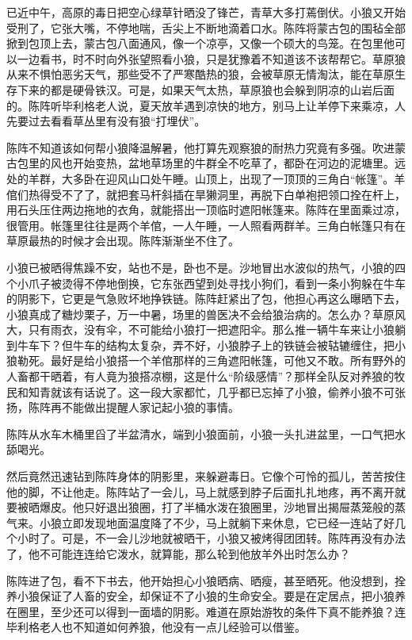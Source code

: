 \par 已近中午，高原的毒日把空心绿草针晒没了锋芒，青草大多打蔫倒伏。小狼又开始受刑了，它张大嘴，不停地喘，舌尖上不断地滴着口水。陈阵将蒙古包的围毡全部掀到包顶上去，蒙古包八面通风，像一个凉亭，又像一个硕大的鸟笼。在包里他可以一边看书，时不时向外张望照看小狼，只是犹豫着不知道该不该帮帮它。草原狼从来不惧怕恶劣天气，那些受不了严寒酷热的狼，会被草原无情淘汰，能在草原生存下来的都是硬骨铁汉。可是，如果天气太热，草原狼也会躲到阴凉的山岩后面的。陈阵听毕利格老人说，夏天放羊遇到凉快的地方，别马上让羊停下来乘凉，人先要过去看看草丛里有没有狼“打埋伏”。
\par 陈阵不知道该如何帮小狼降温解暑，他打算先观察狼的耐热力究竟有多强。吹进蒙古包里的风也开始变热，盆地草场里的牛群全不吃草了，都卧在河边的泥塘里。远处的羊群，大多卧在迎风山口处午睡。山顶上，出现了一顶顶的三角白“帐篷”。羊倌们热得受不了了，就把套马杆斜插在旱獭洞里，再脱下白单袍把领口拴在杆上，用石头压住两边拖地的衣角，就能搭出一顶临时遮阳帐篷来。陈阵在里面乘过凉，很管用。帐篷里往往是两个羊倌，一人午睡，一人照看两群羊。三角白帐篷只有在草原最热的时候才会出现。陈阵渐渐坐不住了。
\par 小狼已被晒得焦躁不安，站也不是，卧也不是。沙地冒出水波似的热气，小狼的四个小爪子被烫得不停地倒换，它东张西望到处寻找小狗们，看到一条小狗躲在牛车的阴影下，它更是气急败坏地挣铁链。陈阵赶紧出了包，他担心再这么曝晒下去，小狼真成了糖炒栗子，万一中暑，场里的兽医决不会给狼治病的。怎么办？草原风大，只有雨衣，没有伞，不可能给小狼打一把遮阳伞。那么推一辆牛车来让小狼躺到牛车下？但牛车的结构太复杂，弄不好，小狼脖子上的铁链会被轱辘缠住，把小狼勒死。最好是给小狼搭一个羊倌那样的三角遮阳帐篷，可他又不敢。所有野外的人畜都干晒着，有人竟为狼搭凉棚，这是什么“阶级感情”？那样全队反对养狼的牧民和知青就该有话说了。这一段大家都忙，几乎都已忘掉了小狼，偷养小狼不可张扬，陈阵再不能做出提醒人家记起小狼的事情。
\par 陈阵从水车木桶里舀了半盆清水，端到小狼面前，小狼一头扎进盆里，一口气把水舔喝光。
\par 然后竟然迅速钻到陈阵身体的阴影里，来躲避毒日。它像个可怜的孤儿，苦苦按住他的脚，不让他走。陈阵站了一会儿，马上就感到脖子后面扎扎地疼，再不离开就要被晒爆皮。他只好退出狼圈，打了半桶水泼在狼圈里，沙地冒出揭屉蒸笼般的蒸气来。小狼立即发现地面温度降了不少，马上就躺下来休息，它已经一连站了好几个小时了。可是，不一会儿沙地就被晒干，小狼又被烤得团团转。陈阵再没有办法了，他不可能连连给它泼水，就算能，那么轮到他放羊外出时怎么办？
\par 陈阵进了包，看不下书去，他开始担心小狼晒病、晒瘦，甚至晒死。他没想到，拴养小狼保证了人畜的安全，却保证不了小狼的生命安全。要是在定居点，把小狼养在圈里，至少还可以得到一面墙的阴影。难道在原始游牧的条件下真不能养狼？连毕利格老人也不知道如何养狼，他没有一点儿经验可以借鉴。
